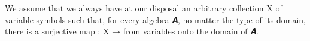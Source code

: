 \documentclass[a4paper,UKenglish,cleveref,autoref,thm-restate]{lipics-v2021}
\begin{document}
We assume that we always have at our disposal an arbitrary collection \ab X of variable symbols such that, for every algebra \ab 𝑨, no matter the type of its domain, 
there is a surjective map  \as : \ab X \as →  from variables onto the domain of \ab 𝑨.
\ccpad
\begin{code}%
\>[0][@{}l@{\AgdaIndent{1}}]%
\>[1]\AgdaSpace{}%
\AgdaSymbol{:}\AgdaSpace{}%
\AgdaSymbol{\{}\AgdaSpace{}%
\AgdaSpace{}%
\AgdaSymbol{:}\AgdaSpace{}%
\AgdaSymbol{\}}\AgdaSpace{}%
\AgdaSpace{}%
\AgdaSpace{}%
\AgdaSpace{}%
\AgdaSpace{}%
\AgdaSpace{}%
\AgdaSpace{}%
\AgdaSpace{}%
\AgdaSpace{}%
\AgdaSpace{}%
\AgdaSpace{}%
\AgdaSpace{}%
\<%
\\
%
\>[1]\AgdaSpace{}%
\AgdaSpace{}%
\AgdaSpace{}%
\AgdaSymbol{=}\AgdaSpace{}%
\AgdaSpace{}%
\AgdaSpace{}%
\AgdaSpace{}%
\AgdaSymbol{(}\AgdaSpace{}%
\AgdaSpace{}%
\AgdaSpace{}%
\AgdaSpace{}%
\AgdaSymbol{)}\AgdaSpace{}%
\AgdaFunction{,}\AgdaSpace{}%
\AgdaSpace{}%
\<%
\end{code}

\end{document}
